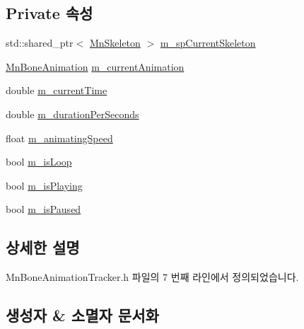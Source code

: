 \subsection*{Private 속성}
\begin{DoxyCompactItemize}
\item 
std\+::shared\+\_\+ptr$<$ \hyperlink{class_m_n_l_1_1_mn_skeleton}{Mn\+Skeleton} $>$ \hyperlink{class_m_n_l_1_1_mn_bone_animation_tracker_aefec935ed7824231963b657b8ddb914b}{m\+\_\+sp\+Current\+Skeleton}
\item 
\hyperlink{class_m_n_l_1_1_mn_bone_animation}{Mn\+Bone\+Animation} \hyperlink{class_m_n_l_1_1_mn_bone_animation_tracker_a8ce5bc87cbbfd5fbb8d442cceb7df2f5}{m\+\_\+current\+Animation}
\item 
double \hyperlink{class_m_n_l_1_1_mn_bone_animation_tracker_acf1032e7352339dbccc640681bb3895a}{m\+\_\+current\+Time}
\item 
double \hyperlink{class_m_n_l_1_1_mn_bone_animation_tracker_aecccf5c8a3fde50062469a35ea083d59}{m\+\_\+duration\+Per\+Seconds}
\item 
float \hyperlink{class_m_n_l_1_1_mn_bone_animation_tracker_aefbe185491262dba571d1201677ef7e1}{m\+\_\+animating\+Speed}
\item 
bool \hyperlink{class_m_n_l_1_1_mn_bone_animation_tracker_af52c92c8b507e21c94457ac47a5641bb}{m\+\_\+is\+Loop}
\item 
bool \hyperlink{class_m_n_l_1_1_mn_bone_animation_tracker_ac5dad518bde253882bda51dd30240d14}{m\+\_\+is\+Playing}
\item 
bool \hyperlink{class_m_n_l_1_1_mn_bone_animation_tracker_a8ed61397e39110735e5a400b78a42986}{m\+\_\+is\+Paused}
\end{DoxyCompactItemize}


\subsection{상세한 설명}


Mn\+Bone\+Animation\+Tracker.\+h 파일의 7 번째 라인에서 정의되었습니다.



\subsection{생성자 \& 소멸자 문서화}
\mbox{\label{class_m_n_l_1_1_mn_bone_animation_tracker_a54ca35d4c15067230ebcf72064abc319}} 
